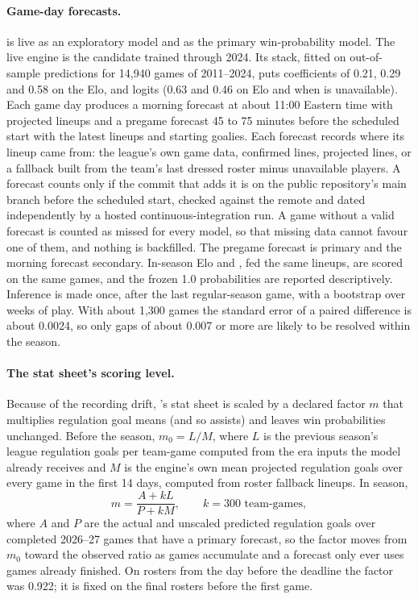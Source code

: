 \paragraph{Game-day forecasts.}
\neurhlG{} is live as an exploratory model and \neurhlH{} as the primary win-probability
model. The live engine is the candidate trained through 2024. Its stack,
fitted on out-of-sample predictions for 14,940 games of 2011--2024, puts
coefficients of 0.21, 0.29 and 0.58 on the Elo, \neurhlG{} and \neurhlH{} logits
(0.63 and 0.46 on Elo and \neurhlG{} when \neurhlH{} is unavailable). Each game day produces a morning forecast at about 11:00 Eastern time
with projected lineups and a pregame forecast 45 to 75 minutes before the
scheduled start with the latest lineups and starting goalies. Each forecast
records where its lineup came from: the league's own game data, confirmed
lines, projected lines, or a fallback built from the team's last dressed roster
minus unavailable players. A forecast counts only if the commit that adds it is
on the public repository's main branch before the scheduled start, checked
against the remote and dated independently by a hosted continuous-integration
run. A game without a valid forecast is counted as missed for every model, so
that missing data cannot favour one of them, and nothing is backfilled. The
pregame forecast is primary and the morning forecast secondary. In-season Elo
and \neurhlH{}, fed the same lineups, are scored on the same games, and the frozen
1.0 probabilities are reported descriptively. Inference is made once, after
the last regular-season game, with a bootstrap over weeks of play. With about
1,300 games the standard error of a paired difference is about 0.0024, so only
gaps of about 0.007 or more are likely to be resolved within the season.

\paragraph{The stat sheet's scoring level.}
Because of the recording drift, \neurhlG{}'s stat sheet is scaled by a declared
factor $m$ that multiplies regulation goal means (and so assists) and leaves
win probabilities unchanged. Before the season, $m_0 = L / M$, where $L$ is the
previous season's league regulation goals per team-game computed from the era
inputs the model already receives and $M$ is the engine's own mean projected
regulation goals over every game in the first 14 days, computed from roster
fallback lineups. In season,
\begin{equation}
m = \frac{A + kL}{P + kM}, \qquad k = 300 \text{ team-games},
\end{equation}
where $A$ and $P$ are the actual and unscaled predicted regulation goals over
completed 2026--27 games that have a primary forecast, so the factor moves
from $m_0$ toward the observed ratio as games accumulate and a forecast only
ever uses games already finished. On rosters from the day before the deadline
the factor was 0.922; it is fixed on the final rosters before the first game.

